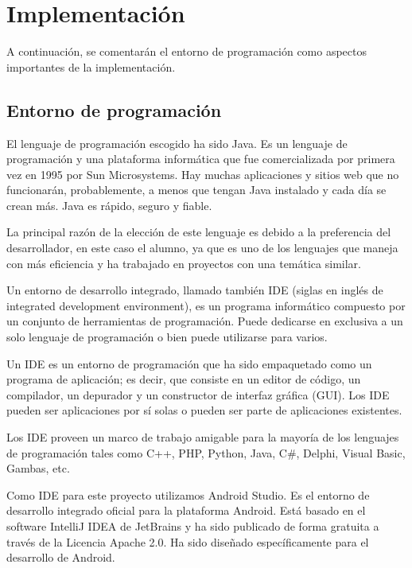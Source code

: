 \chapter{Implementación}\label{cap:implementacion}

A continuación, se comentarán el entorno de programación como aspectos importantes de la implementación.

\section{Entorno de programación}

El lenguaje de programación escogido ha sido Java. Es un lenguaje de programación y una plataforma informática que fue comercializada por primera vez en 1995 por Sun Microsystems. Hay muchas aplicaciones y sitios web que no funcionarán, probablemente, a menos que tengan Java instalado y cada día se crean más. Java es rápido, seguro y fiable.

La principal razón de la elección de este lenguaje es debido a la preferencia del desarrollador, en este caso el alumno, ya que es uno de los lenguajes que maneja con más eficiencia y ha trabajado en proyectos con una temática similar.

Un entorno de desarrollo integrado, llamado también IDE (siglas en inglés de integrated development environment), es un programa informático compuesto por un conjunto de herramientas de programación. Puede dedicarse en exclusiva a un solo lenguaje de programación o bien puede utilizarse para varios.

Un IDE es un entorno de programación que ha sido empaquetado como un programa de aplicación; es decir, que consiste en un editor de código, un compilador, un depurador y un constructor de interfaz gráfica (GUI). Los IDE pueden ser aplicaciones por sí solas o pueden ser parte de aplicaciones existentes.

Los IDE proveen un marco de trabajo amigable para la mayoría de los lenguajes de programación tales como C++, PHP, Python, Java, C\#, Delphi, Visual Basic, Gambas, etc. 

Como IDE para este proyecto utilizamos Android Studio. Es el entorno de desarrollo integrado oficial para la plataforma Android. Está basado en el software IntelliJ IDEA de JetBrains y ha sido publicado de forma gratuita a través de la Licencia Apache 2.0. Ha sido diseñado específicamente para el desarrollo de Android.

\newpage